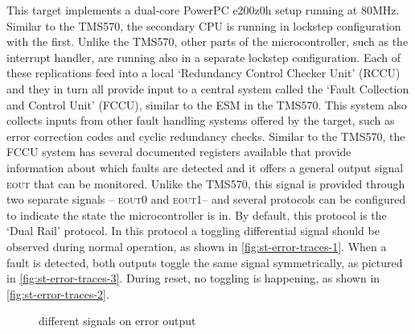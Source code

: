\documentclass[10pt]{article}
\newcommand{\TI}{TMS570\xspace}
\newcommand{\errorpin}{\textsc{eout}\xspace}
\newcommand{\errorpinzero}{\textsc{eout0}\xspace}
\newcommand{\errorpinone}{\textsc{eout1}\xspace}
\begin{document}
      This target implements a dual-core PowerPC e200z0h setup running at 80MHz. Similar to the \TI, the secondary CPU is running in lockstep configuration with the first. Unlike the \TI, other parts of the microcontroller, such as the interrupt handler, are running also in a separate lockstep configuration. Each of these replications feed into a local `Redundancy Control Checker Unit' (RCCU) and they in turn all provide input to a central system called the `Fault Collection and Control Unit' (FCCU), similar to the ESM in the \TI. This system also collects inputs from other fault handling systems offered by the target, such as error correction codes and cyclic redundancy checks. \cite{stmicroelectronics_datasheet_2015} Similar to the \TI, the FCCU system has several documented registers \cite{stmicroelectronics_technical_2015} available that provide information about which faults are detected and it offers a general output signal \errorpin that can be monitored. Unlike the \TI, this signal is provided through two separate signals -- \errorpinzero and \errorpinone -- and several protocols can be configured to indicate the state the microcontroller is in. By default, this protocol is the `Dual Rail' protocol. In this protocol a toggling differential signal should be observed during normal operation, as shown in \autoref{fig:st-error-traces-1}. When a fault is detected, both outputs toggle the same signal symmetrically, as pictured in \autoref{fig:st-error-traces-3}. During reset, no toggling is happening, as shown in \autoref{fig:st-error-traces-2}.

      \begin{figure}[H]
          \centering
          \caption{different signals on error output}
          \label{fig:st-error-traces}
      \end{figure}
\end{document}
